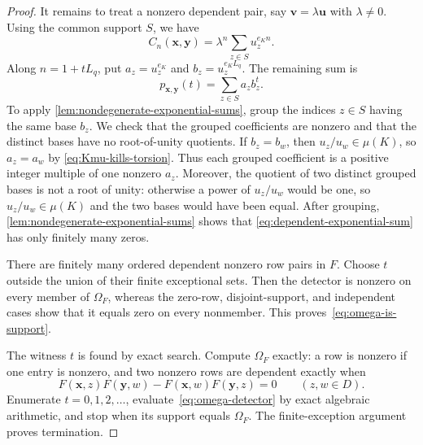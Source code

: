 \documentclass[11pt,letterpaper,onecolumn]{article}
\theoremstyle{plain}
\theoremstyle{definition}
\theoremstyle{remark}
\newcommand{\RowEq}[1]{\Omega_{#1}}
\begin{document}
\begin{proof}
It remains to treat a nonzero dependent pair, say
$\mathbf v=\lambda\mathbf u$ with $\lambda\ne0$.  Using the common support
$S$, we have
\begin{equation*}
  C_n(\mathbf x,\mathbf y)
   =\lambda^n\sum_{z\in S}u_z^{e_K n}.
\end{equation*}
Along $n=1+tL_q$, put $a_z=u_z^{e_K}$ and
$b_z=u_z^{e_K L_q}$.  The remaining sum is
\begin{equation}
  p_{\mathbf x,\mathbf y}(t)=\sum_{z\in S}a_zb_z^t.
  \label{eq:dependent-exponential-sum}
\end{equation}
To apply \cref{lem:nondegenerate-exponential-sums}, group the indices
$z\in S$ having the same base $b_z$.  We check that the grouped coefficients
are nonzero and that the distinct bases have no root-of-unity quotients.
If $b_z=b_w$, then
$u_z/u_w\in\mu(K)$, so $a_z=a_w$ by
\eqref{eq:Kmu-kills-torsion}.  Thus each grouped coefficient is a positive
integer multiple of one nonzero $a_z$.  Moreover, the quotient of two
distinct grouped bases is not a root of unity: otherwise a power of
$u_z/u_w$ would be one, so $u_z/u_w\in\mu(K)$ and the two bases would have
been equal.  After grouping,
\cref{lem:nondegenerate-exponential-sums} shows that
\eqref{eq:dependent-exponential-sum} has only finitely many zeros.

There are finitely many ordered dependent nonzero row pairs in $F$.  Choose
$t$ outside the union of their finite exceptional sets.  Then the detector
is nonzero on every member of $\RowEq F$, whereas the zero-row,
disjoint-support, and independent cases show that it equals zero on every
nonmember.  This proves~\eqref{eq:omega-is-support}.

The witness $t$ is found by exact search.  Compute $\RowEq F$ exactly: a row
is nonzero if one entry is nonzero, and two
nonzero rows are dependent exactly when
\begin{equation*}
  F(\mathbf x,z)F(\mathbf y,w)
  -F(\mathbf x,w)F(\mathbf y,z)=0
  \qquad(z,w\in D).
\end{equation*}
Enumerate $t=0,1,2,\ldots$, evaluate~\eqref{eq:omega-detector} by exact
algebraic arithmetic, and stop when its support equals $\RowEq F$.  The
finite-exception argument proves termination.


\end{proof}
\end{document}
